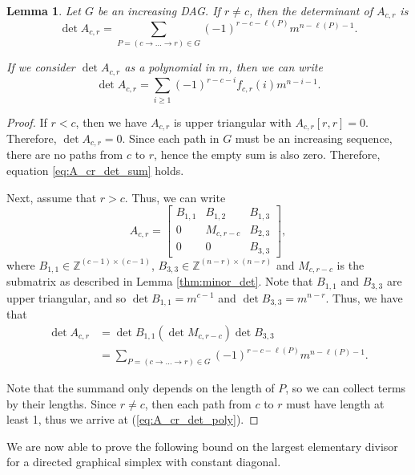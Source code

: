\documentclass[12pt]{amsart}
\newtheorem{lemma}[thm]{Lemma}
\theoremstyle{definition}
\numberwithin{equation}{section}
\newcommand{\ring}[1]{\ensuremath{\mathbb{#1}}}
\renewcommand\>{\rangle}
\newcommand\<{\langle}
\newcommand\0{\mathbf{0}}
\newcommand\ZZ{\ring{Z}}
\begin{document}
\begin{lemma}\label{thm:n-1_minors}
	Let $G$ be an increasing DAG. If $r \neq c$, then the determinant of $A_{c,r}$ is
	\begin{equation}\label{eq:A_cr_det_sum}
		\det A_{c,r} = \sum_{P = (c \to \dots \to r) \in G} (-1)^{r-c-\ell(P)} m^{n-\ell(P)-1}.
	\end{equation}
	
	If we consider $\det A_{c,r}$ as a polynomial in $m$, then we can write
	\begin{equation}\label{eq:A_cr_det_poly}
		\det A_{c,r} = \sum_{i\geq 1} (-1)^{r-c-i} f_{c,r}(i) m^{n-i-1}.
	\end{equation}
\end{lemma}
\begin{proof}	
	
	If $r < c$, then we have $A_{c,r}$ is upper triangular with $A_{c,r}[r,r] = 0$. 
	Therefore, $\det A_{c,r} = 0$. Since each path in $G$ must be an increasing sequence, there are no paths from $c$ to $r$, hence the empty sum is also zero. 
	Therefore, equation \eqref{eq:A_cr_det_sum} holds. 
	
	Next, assume that $r > c$. Thus, we can write 
	\[A_{c,r} = \left[\begin{array}{c|c|c}
		B_{1,1} & B_{1,2} & B_{1,3} \\
		\hline
		0 & M_{c, r-c} & B_{2,3} \\
		\hline
		0 & 0 & B_{3,3}
	\end{array}\right],\]
	where $B_{1,1} \in \ZZ^{(c-1)\times(c-1)}$, $B_{3,3} \in \ZZ^{(n-r)\times (n-r)}$ and $M_{c,r-c}$ is the submatrix as described in Lemma \ref{thm:minor_det}. 
	Note that $B_{1,1}$ and $B_{3,3}$ are upper triangular, and so $\det B_{1,1} = m^{c-1}$ and $\det B_{3,3} = m^{n-r}$.  
	Thus, we have that 
	\begin{align*}
		\det A_{c,r} &= \det B_{1,1} (\det M_{c, r-c} )\det B_{3,3} \\
		&= \sum_{P = (c \to \dots \to r) \in G} (-1)^{r-c-\ell(P)} m^{n-\ell(P)-1}.
	\end{align*}
	
	Note that the summand only depends on the length of $P$, so we can collect terms by their lengths. Since $r\neq c$, then each path from $c$ to $r$ must have length at least 1, thus we arrive at (\ref{eq:A_cr_det_poly}).
\end{proof}

We are now able to prove the following bound on the largest elementary divisor for a directed graphical simplex with constant diagonal.
\end{document}
